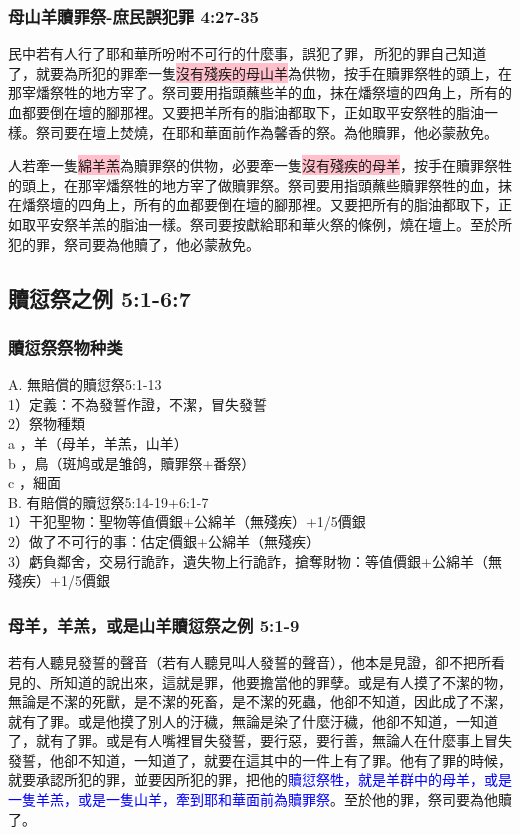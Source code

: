 \subsubsection{母山羊贖罪祭-庶民誤犯罪 4:27-35}
民中若有人行了耶和華所吩咐不可行的什麼事，誤犯了罪， 所犯的罪自己知道了，就要為所犯的罪牽一隻\colorbox{pink}{沒有殘疾的母山羊}為供物，按手在贖罪祭牲的頭上，在那宰燔祭牲的地方宰了。祭司要用指頭蘸些羊的血，抹在燔祭壇的四角上，所有的血都要倒在壇的腳那裡。又要把羊所有的脂油都取下，正如取平安祭牲的脂油一樣。祭司要在壇上焚燒，在耶和華面前作為馨香的祭。為他贖罪，他必蒙赦免。

人若牽一隻\colorbox{pink}{綿羊羔}為贖罪祭的供物，必要牽一隻\colorbox{pink}{沒有殘疾的母羊}，按手在贖罪祭牲的頭上，在那宰燔祭牲的地方宰了做贖罪祭。祭司要用指頭蘸些贖罪祭牲的血，抹在燔祭壇的四角上，所有的血都要倒在壇的腳那裡。又要把所有的脂油都取下，正如取平安祭羊羔的脂油一樣。祭司要按獻給耶和華火祭的條例，燒在壇上。至於所犯的罪，祭司要為他贖了，他必蒙赦免。

\subsection{贖愆祭之例 5:1-6:7}

\subsubsection{贖愆祭祭物种类}
\noindent
  A. 無賠償的贖愆祭5:1-13\\
    1）定義：不為發誓作證，不潔，冒失發誓\\
    2）祭物種類\\
         a ，羊（母羊，羊羔，山羊）\\
         b ，鳥（斑鸠或是雏鸽，贖罪祭+番祭）\\
         c ，細面\\
  B. 有賠償的贖愆祭5:14-19+6:1-7\\
    1）干犯聖物：聖物等值價銀+公綿羊（無殘疾）+1/5價銀\\
    2）做了不可行的事：估定價銀+公綿羊（無殘疾）\\
    3）虧負鄰舍，交易行詭詐，遺失物上行詭詐，搶奪財物：等值價銀+公綿羊（無殘疾）+1/5價銀

\subsubsection{母羊，羊羔，或是山羊贖愆祭之例 5:1-9}
若有人聽見發誓的聲音（若有人聽見叫人發誓的聲音），他本是見證，卻不把所看見的、所知道的說出來，這就是罪，他要擔當他的罪孽。或是有人摸了不潔的物，無論是不潔的死獸，是不潔的死畜，是不潔的死蟲，他卻不知道，因此成了不潔，就有了罪。或是他摸了別人的汙穢，無論是染了什麼汙穢，他卻不知道，一知道了，就有了罪。或是有人嘴裡冒失發誓，要行惡，要行善，無論人在什麼事上冒失發誓，他卻不知道，一知道了，就要在這其中的一件上有了罪。他有了罪的時候，就要承認所犯的罪，並要因所犯的罪，把他的\textcolor{blue}{贖愆祭牲，就是羊群中的母羊，或是一隻羊羔，或是一隻山羊，牽到耶和華面前為贖罪祭}。至於他的罪，祭司要為他贖了。

